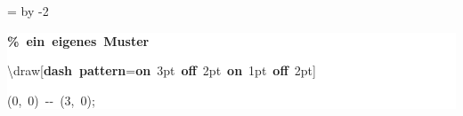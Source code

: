 \begingroup
\ttfamily
{}
=\textwidth
\advance{} by -2\fboxsep
\noindent
\colorbox{background}
{%
\parbox{\dimen255}
{%
\rule[-0.5ex]{0pt}{2.5ex}\hspace*{0.0em}\textcolor{G}{\textbf{\%~ein~eigenes~Muster}}\\
\rule[-0.5ex]{0pt}{2.5ex}\hspace*{0.0em}\textbackslash{}draw[\textcolor{R}{\textbf{dash~pattern}}=\textcolor{R}{\textbf{on}}~3pt~\textcolor{R}{\textbf{off}}~2pt~\textcolor{R}{\textbf{on}}~1pt~\textcolor{R}{\textbf{off}}~2pt]\\
\rule[-0.5ex]{0pt}{2.5ex}\hspace*{2.5em}(0,~0)~{-}{-}~(3,~0);}%
}%
\endgroup
